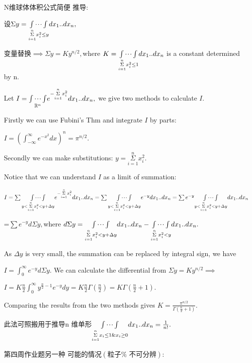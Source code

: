 \documentclass{ctexart}
\def\NEG#1{\mathbb{#1}}
\begin{document}
N维球体体积公式简便%
推导:

设$\Sigma y=\underset{\underset{i=1}{\overset{n}{\Sigma }}%
x_{i}^{2}\leq y}{\idotsint }dx_{1}..dx_{n},$

变量替换$\implies \Sigma y=Ky^{n/2},$where $K=%
\underset{\underset{i=1}{\overset{n}{\Sigma }}x_{i}^{2}\leq 1}{\idotsint }%
dx_{1}..dx_{n}$ is a constant determined by n.

Let $I=\underset{\NEG{R}^{n}}{\idotsint }e^{-\underset{i=1}{\overset{n}{%
\Sigma }}x_{i}^{2}}dx_{1}..dx_{n},$ we give two methods to calculate $I.$

Firstly we can use Fubini's Thm and integrate $I$ by parts:

$I=\left( \int_{-\infty }^{\infty }e^{-x^{2}}dx\right) ^{n}=\pi ^{n/2}.$

Secondly we can make substitutions: $y=\underset{i=1}{\overset{n}{\Sigma }}%
x_{i}^{2}.$

Notice that we can understand $I$ as a limit of summation:

$I=\sum \underset{y<\underset{i=1}{\overset{n}{\Sigma }}x_{i}^{2}<y+\Delta y}%
{\idotsint }e^{-\underset{i=1}{\overset{n}{\Sigma }}%
x_{i}^{2}}dx_{1}..dx_{n}=\sum \underset{y<\underset{i=1}{\overset{n}{\Sigma }%
}x_{i}^{2}<y+\Delta y}{\idotsint }e^{-y}dx_{1}..dx_{n}=\sum e^{-y}\underset{%
y<\underset{i=1}{\overset{n}{\Sigma }}x_{i}^{2}<y+\Delta y}{\idotsint }%
dx_{1}..dx_{n}$

=$\sum e^{-y}d\Sigma y,$where $d\Sigma y=\underset{\underset{i=1}{\overset{n}%
{\Sigma }}x_{i}^{2}<y+\Delta y}{\idotsint }dx_{1}..dx_{n}-\underset{%
\underset{i=1}{\overset{n}{\Sigma }}x_{i}^{2}<y}{\idotsint }dx_{1}..dx_{n}.$

As $\Delta y$ is very small, the summation can be replaced by integral sign,
we have

$I=\int_{0}^{\infty }e^{-y}d\Sigma y.$ We can calculate the differential
from $\Sigma y=Ky^{n/2}\implies $

$I=K\frac{n}{2}\int_{0}^{\infty }y^{\frac{n}{2}-1}e^{-y}dy=K\frac{n}{2}%
\Gamma \left( \frac{n}{2}\right) =K\Gamma \left( \frac{n}{2}+1\right) .$

Comparing the results from the two methods gives $K=\frac{\pi ^{n/2}}{\Gamma
\left( \frac{n}{2}+1\right) }.$

此法可照搬用于推导n%
维单形$\underset{\underset{i=1}{\overset{n}{\Sigma }}%
x_{i}\leq 1\&x_{i}\geq 0}{\idotsint }dx_{1}..dx_{n}=\frac{1}{n!}.$

\bigskip

第四周作业题另一种%
可能的情况$\left( \text{粒子%
不可分辨}\right) $:
\end{document}
